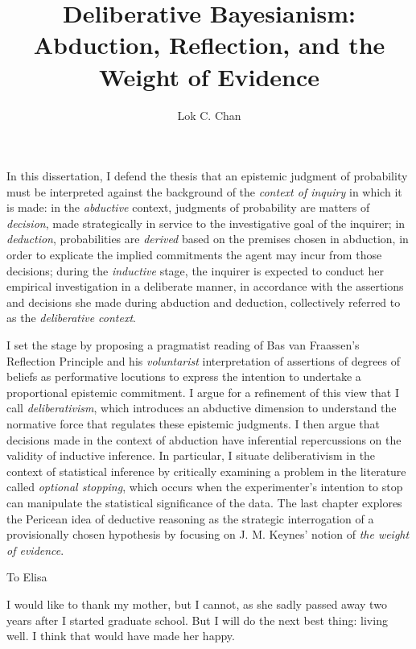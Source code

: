 \documentclass[PhD]{dukethesis2006}
\author{Lok C. Chan}
\title{Deliberative Bayesianism:\\Abduction, Reflection, and the Weight of Evidence}
\newenvironment{dedication}
  {\clearpage           %
   \thispagestyle{empty}%
   \vspace*{\stretch{1}}%
   \itshape             %
   \raggedleft          %
  }
  {\par %
   \vspace{\stretch{3}} %
   \clearpage           %
  }
\begin{document}
\maketitle

\makeabstract
\Copyright
\abstract
In this dissertation, I defend the thesis that an epistemic judgment of
probability must be interpreted against the background of the
\emph{context of inquiry} in which it is made: in the \emph{abductive} context,
judgments of probability are matters of \emph{decision}, made
strategically in service to the investigative goal of the inquirer; in
\emph{deduction}, probabilities are \emph{derived} based on the
premises chosen in abduction, in order to explicate the implied
commitments the agent may incur from those decisions; during the
\emph{inductive} stage, the inquirer is expected to conduct her empirical
investigation in a deliberate manner, in accordance with the assertions and
decisions she made during abduction and deduction, collectively referred
to as the \emph{deliberative context}.

I set the stage by proposing a pragmatist reading of Bas van Fraassen's Reflection Principle and his \emph{voluntarist} interpretation of assertions of degrees of beliefs as performative locutions to express the intention to undertake a proportional epistemic commitment. I argue for a refinement of this view that I call \emph{deliberativism}, which introduces an abductive dimension to understand the normative force that regulates these epistemic judgments. I then argue that decisions made in the context of abduction have inferential repercussions on the validity of inductive inference. In particular, I situate deliberativism in the context of statistical inference by critically examining a problem in the literature called \emph{optional stopping}, which occurs when the experimenter's intention to stop can manipulate the statistical significance of the data. The last chapter explores the Pericean idea of deductive reasoning as the strategic interrogation of a provisionally chosen hypothesis by focusing on J. M. Keynes' notion of \emph{the weight of evidence}.


\begin{dedication}
	To Elisa
	\end{dedication}

\singlespacing
\tableofcontents
\listoffigures
\listoftables
\doublespacing

\acknowledgements

I would like to thank my mother, but I cannot, as she sadly passed away two years after I started graduate school. But I will do the next best thing: living well. I think that would have made her happy.
\end{document}
